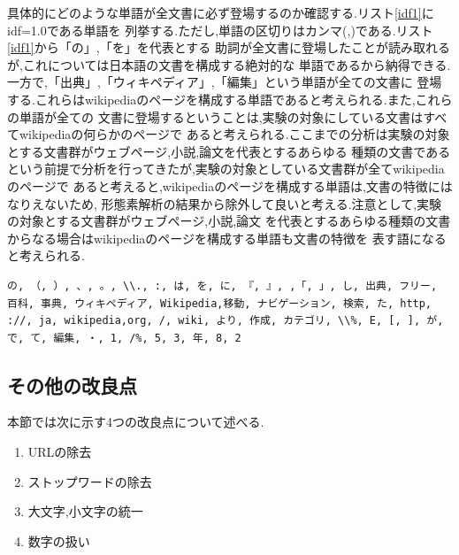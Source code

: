 \documentclass[a4j]{jarticle}
\begin{document}
具体的にどのような単語が全文書に必ず登場するのか確認する.リスト\ref{idf1}にidf=1.0である単語を
列挙する.ただし,単語の区切りはカンマ(,)である.リスト\ref{idf1}から「の」,「を」を代表とする
助詞が全文書に登場したことが読み取れるが,これについては日本語の文書を構成する絶対的な
単語であるから納得できる.一方で,「出典」,「ウィキペディア」,「編集」という単語が全ての文書に
登場する.これらはwikipedia\cite{wikipedia}のページを構成する単語であると考えられる.また,これらの単語が全ての
文書に登場するということは,実験の対象にしている文書はすべてwikipediaの何らかのページで
あると考えられる.ここまでの分析は実験の対象とする文書群がウェブページ,小説,論文を代表とするあらゆる
種類の文書であるという前提で分析を行ってきたが,実験の対象としている文書群が全てwikipediaのページで
あると考えると,wikipediaのページを構成する単語は,文書の特徴にはなりえないため,
形態素解析の結果から除外して良いと考える.注意として,実験の対象とする文書群がウェブページ,小説,論文
を代表とするあらゆる種類の文書からなる場合はwikipediaのページを構成する単語も文書の特徴を
表す語になると考えられる.
\begin{lstlisting}[basicstyle=\ttfamily\footnotesize, frame=single,label=idf1,caption= idfが1.0の単語]
の, （, ）, 、, 。, \\., :, は, を, に, 『, 』, ,「, 」, し, 出典, フリー,
百科, 事典, ウィキペディア, Wikipedia,移動, ナビゲーション, 検索, た, http,
://, ja, wikipedia,org, /, wiki, より, 作成, カテゴリ, \\%, E, [, ], が,
で, て, 編集, ・, 1, /%, 5, 3, 年, 8, 2
	\end{lstlisting}

\subsection{その他の改良点}
本節では次に示す4つの改良点について述べる.
\begin{enumerate}
	\item URLの除去
	\item ストップワードの除去
	\item 大文字,小文字の統一
	\item 数字の扱い
\end{enumerate}
\end{document}

